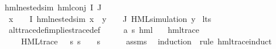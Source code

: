 \begin{isabellebody}
{\isachardoublequoteopen}hml{\isacharunderscore}{\kern0pt}{}{\isacharunderscore}{\kern0pt}nested{\isacharunderscore}{\kern0pt}sim\ {\isacharparenleft}{\kern0pt}hml{\isacharunderscore}{\kern0pt}conj\ I\ J\ {\isasymPhi}{\isacharparenright}{\kern0pt}{\isachardoublequoteclose}\ \isanewline
{}\ {\isachardoublequoteopen}{\isacharparenleft}{\kern0pt}{\isasymforall}x\ {\isasymin}\ {\isacharparenleft}{\kern0pt}{\isasymPhi}\ {\isacharbackquote}{\kern0pt}\ I{\isacharparenright}{\kern0pt}{\isachardot}{\kern0pt}\ hml{\isacharunderscore}{\kern0pt}{}{\isacharunderscore}{\kern0pt}nested{\isacharunderscore}{\kern0pt}sim\ x{\isacharparenright}{\kern0pt}\ {\isasymand}\ {\isacharparenleft}{\kern0pt}{\isasymforall}y\ {\isasymin}\ {\isacharparenleft}{\kern0pt}{\isasymPhi}\ {\isacharbackquote}{\kern0pt}\ J{\isacharparenright}{\kern0pt}{\isachardot}{\kern0pt}\ HML{\isacharunderscore}{\kern0pt}simulation\ y{\isacharparenright}{\kern0pt}{\isachardoublequoteclose}\isanewline
\isanewline
{}\isamarkupfalse%
\ lts\ \ \isanewline
\isanewline
{}\isamarkupfalse%
\ alt{\isacharunderscore}{\kern0pt}trace{\isacharunderscore}{\kern0pt}def{\isacharunderscore}{\kern0pt}implies{\isacharunderscore}{\kern0pt}trace{\isacharunderscore}{\kern0pt}def{\isacharcolon}{\kern0pt}\isanewline
\ \ \ {\isasymphi}\ {\isacharcolon}{\kern0pt}{\isacharcolon}{\kern0pt}\ {\isachardoublequoteopen}{\isacharparenleft}{\kern0pt}{\isacharprime}{\kern0pt}a{\isacharcomma}{\kern0pt}\ {\isacharprime}{\kern0pt}s{\isacharparenright}{\kern0pt}\ hml{\isachardoublequoteclose}\isanewline
\ \ \ {\isachardoublequoteopen}hml{\isacharunderscore}{\kern0pt}trace\ {\isasymphi}{\isachardoublequoteclose}\isanewline
\ \ \ {\isachardoublequoteopen}{\isasymexists}{\isasympsi}{\isachardot}{\kern0pt}\ HML{\isacharunderscore}{\kern0pt}trace\ {\isasympsi}\ {\isasymand}\ {\isacharparenleft}{\kern0pt}{\isasymforall}s{\isachardot}{\kern0pt}\ {\isacharparenleft}{\kern0pt}s\ {\isasymTurnstile}\ {\isasymphi}{\isacharparenright}{\kern0pt}\ {\isasymlongleftrightarrow}\ {\isacharparenleft}{\kern0pt}s\ {\isasymTurnstile}\ {\isasympsi}{\isacharparenright}{\kern0pt}{\isacharparenright}{\kern0pt}{\isachardoublequoteclose}\isanewline
%
\isadelimproof
\ \ %
\endisadelimproof
%
\isatagproof
{}\isamarkupfalse%
\ assms\ \ \isanewline
{}\isamarkupfalse%
{\isacharparenleft}{\kern0pt}induction\ {\isasymphi}\ rule{\isacharcolon}{\kern0pt}\ hml{\isacharunderscore}{\kern0pt}trace{\isachardot}{\kern0pt}induct{\isacharparenright}{\kern0pt}\isanewline

\end{isabellebody}
